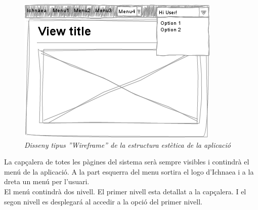 \begin{figure}[H]
  \centering
  \includegraphics[scale=0.7]{img/design/Maininterface.png}
  \caption{\textit{Disseny tipus ''Wireframe'' de la estructura estètica de la aplicació}}
  \label{fig:maininterface}
\end{figure}

La capçalera de totes les p\`{a}gines del sistema serà sempre visibles i contindrà el menú de la aplicació. A la part esquerra del menu sortira el logo d'Ichnaea i a la dreta un menú per l'usuari.\\

El menú contindrà dos nivell. El primer nivell esta detallat a la capçalera. I el segon nivell es desplegar\'{a} al accedir a la opci\'{o} del primer nivell.\\

